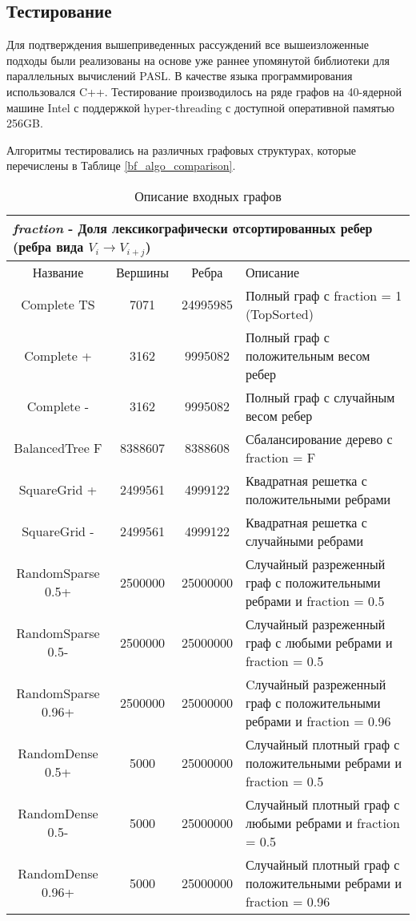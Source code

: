\FloatBarrier
\subsection{Тестирование}

Для подтверждения вышеприведенных рассуждений все вышеизложенные подходы были реализованы на основе уже раннее упомянутой библиотеки для параллельных вычислений PASL. В качестве языка программирования использовался C++. Тестирование производилось на ряде графов на 40-ядерной машине Intel с поддержкой hyper-threading \cite{HYPERTHREADING} с доступной оперативной памятью 256GB. 

Алгоритмы тестировались на различных графовых структурах, которые перечислены в Таблице \ref{bf_algo_comparison}. 
\FloatBarrier
\begin{table}[H]
\centering
\caption{Описание входных графов}

\begin{tabular}{c | c | c | l}  
\multicolumn{4}{l}{\footnotesize \textit{fraction} - Доля лексикографически отсортированных ребер (ребра вида $V_i \rightarrow V_{i+j}$) }\\
\hline
Название & Вершины & Ребра & Описание\\
\hline\hline
Complete TS & 7071 & 24995985 & Полный граф с fraction = 1 (TopSorted)\\  
Complete + & 3162 & 9995082 & Полный граф с положительным весом ребер \\  
Complete - & 3162 & 9995082 & Полный граф с случайным весом ребер \\  
BalancedTree F & 8388607 & 8388608 & Сбалансирование дерево с fraction = F \\  
SquareGrid + & 2499561 & 4999122 & Квадратная решетка с положительными ребрами \\  
SquareGrid - & 2499561 & 4999122 & Квадратная решетка с случайными ребрами \\  
RandomSparse 0.5+ & 2500000 & 25000000 & \pbox{9cm}{Случайный разреженный граф с положительными ребрами и fraction = 0.5\\}  \\  
RandomSparse 0.5- & 2500000 & 25000000 & \pbox{9cm}{Случайный разреженный граф с любыми ребрами и fraction = 0.5\\}  \\  
RandomSparse 0.96+ & 2500000 & 25000000 & \pbox{9cm}{Cлучайный разреженный граф с положительными ребрами и fraction = 0.96\\} \\  
RandomDense 0.5+ & 5000 & 25000000 & \pbox{9cm}{Случайный плотный граф с положительными ребрами и fraction = 0.5\\}  \\  
RandomDense 0.5- & 5000 & 25000000 & \pbox{9cm}{Случайный плотный граф с любыми ребрами и fraction = 0.5\\}  \\  
RandomDense 0.96+ & 5000 & 25000000 & \pbox{9cm}{Случайный плотный граф с положительными ребрами и fraction = 0.96\\}  \\  
\hline


\end{tabular}
\end{table}
